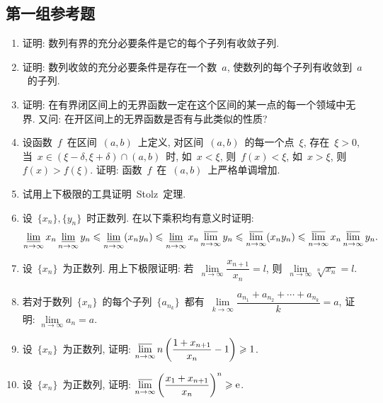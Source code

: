 \documentclass[UTF8,a4paper,11pt,twoside]{book}
\newcommand{\e}{\mathrm e}
\begin{document}
\subsection{第一组参考题}
\begin{enumerate}
	\item 证明: 数列有界的充分必要条件是它的每个子列有收敛子列.

	\item 证明: 数列收敛的充分必要条件是存在一个数~$a$, 使数列的每个子列有收敛到~$a$~的子列.

	\item 证明: 在有界闭区间上的无界函数一定在这个区间的某一点的每一个领域中无界. 又问: 在开区间上的无界函数是否有与此类似的性质?

	\item 设函数~$f$~在区间~$(a,b)$~上定义, 对区间~$(a,b)$~的每一个点~$\xi$, 存在~$\xi>0$, 当~$x\in(\xi-\delta,\xi+\delta)\cap(a,b)$~时, 如~$x<\xi$, 则~$f(x)<\xi$, 如~$x>\xi$, 则~$f(x)>f(\xi)$. 证明: 函数~$f$~在~$(a,b)$~上严格单调增加.

	\item 试用上下极限的工具证明~Stolz~定理.

	\item 设~$\{x_n\}, \{y_n\}$~时正数列. 在以下乘积均有意义时证明:
	      \[
		      \varliminf_{n\to\infty} x_n \varliminf_{n\to\infty} y_n\leqslant \varliminf_{n\to\infty} (x_ny_n)\leqslant \varliminf_{n\to\infty} x_n \varlimsup_{n\to\infty} y_n \leqslant \varlimsup_{n\to\infty} (x_ny_n) \leqslant \varlimsup_{n\to\infty} x_n \varlimsup_{n\to\infty} y_n.
	      \]

	\item 设~$\{x_n\}$~为正数列. 用上下极限证明: 若~$\lim\limits_{n\to\infty} \dfrac{x_{n+1}}{x_n}=l$, 则~$\lim\limits_{n\to\infty} \sqrt[n]{x_n}=l$.

	\item 若对于数列~$\{x_n\}$~的每个子列~$\{a_{n_k}\}$~都有~$\lim\limits_{k\to\infty} \dfrac{a_{n_1}+a_{n_2}+\cdots+a_{n_k}}{k}=a$, 证明: $\lim\limits_{n\to\infty} a_n=a$.

	\item 设~$\{x_n\}$~为正数列, 证明: $\varlimsup\limits_{n\to\infty} n\left(\dfrac{1+x_{n+1}}{x_n}-1\right)\geqslant 1$.

	\item 设~$\{x_n\}$~为正数列, 证明: $\varlimsup\limits_{n\to\infty} \left(\dfrac{x_1+x_{n+1}}{x_n}\right)^n\geqslant \e$.
\end{enumerate}
\end{document}
